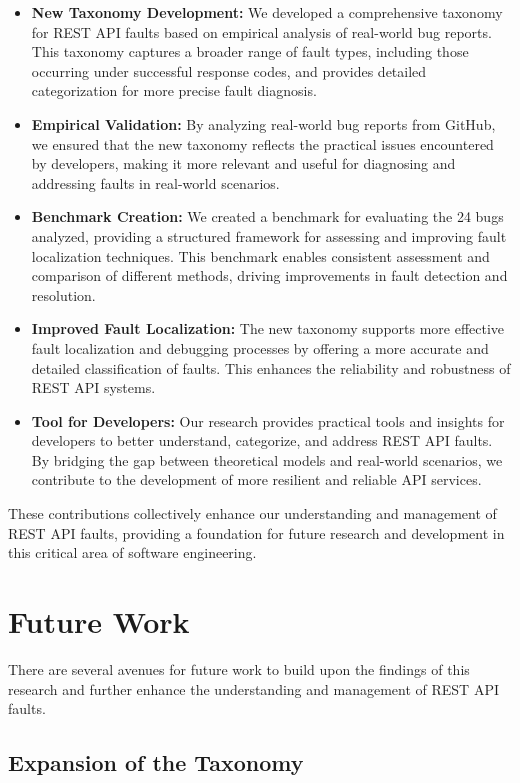 \documentclass[conference]{IEEEtran}
\begin{document}
\begin{itemize}
    \item \textbf{New Taxonomy Development:} We developed a comprehensive taxonomy for REST API faults based on empirical analysis of real-world bug reports. This taxonomy captures a broader range of fault types, including those occurring under successful response codes, and provides detailed categorization for more precise fault diagnosis.
    \item \textbf{Empirical Validation:} By analyzing real-world bug reports from GitHub, we ensured that the new taxonomy reflects the practical issues encountered by developers, making it more relevant and useful for diagnosing and addressing faults in real-world scenarios.
    \item \textbf{Benchmark Creation:} We created a benchmark for evaluating the 24 bugs analyzed, providing a structured framework for assessing and improving fault localization techniques. This benchmark enables consistent assessment and comparison of different methods, driving improvements in fault detection and resolution.
    \item \textbf{Improved Fault Localization:} The new taxonomy supports more effective fault localization and debugging processes by offering a more accurate and detailed classification of faults. This enhances the reliability and robustness of REST API systems.
    \item \textbf{Tool for Developers:} Our research provides practical tools and insights for developers to better understand, categorize, and address REST API faults. By bridging the gap between theoretical models and real-world scenarios, we contribute to the development of more resilient and reliable API services.
\end{itemize}

These contributions collectively enhance our understanding and management of REST API faults, providing a foundation for future research and development in this critical area of software engineering.

\section{Future Work}
\label{sec:futurework}

There are several avenues for future work to build upon the findings of this research and further enhance the understanding and management of REST API faults.

\subsection{Expansion of the Taxonomy}
\end{document}
